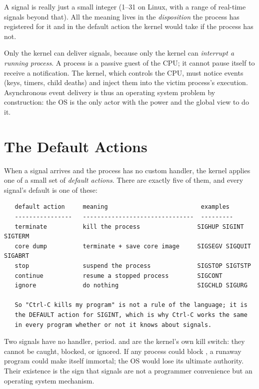 A signal is really just a small integer (1--31 on Linux, with a range
of real-time signals beyond that). All the meaning lives in the
\emph{disposition} the process has registered for it and in the default
action the kernel would take if the process has not.

\begin{osconcept}
Only the kernel can deliver signals, because only the kernel can
\emph{interrupt a running process}. A process is a passive guest of the
CPU; it cannot pause itself to receive a notification. The kernel, which
controls the CPU, must notice events (keys, timers, child deaths) and
inject them into the victim process's execution. Asynchronous event
delivery is thus an operating system problem by construction: the OS is
the only actor with the power and the global view to do it.
\end{osconcept}

\section{The Default Actions}

When a signal arrives and the process has no custom handler, the kernel
applies one of a small set of \emph{default actions}. There are exactly
five of them, and every signal's default is one of these:

\begin{verbatim}
   default action     meaning                          examples
   ----------------   -------------------------------  ---------
   terminate          kill the process                SIGHUP SIGINT SIGTERM
   core dump          terminate + save core image     SIGSEGV SIGQUIT SIGABRT
   stop               suspend the process             SIGSTOP SIGTSTP
   continue           resume a stopped process        SIGCONT
   ignore             do nothing                      SIGCHLD SIGURG

   So "Ctrl-C kills my program" is not a rule of the language; it is
   the DEFAULT action for SIGINT, which is why Ctrl-C works the same
   in every program whether or not it knows about signals.
\end{verbatim}

Two signals have no handler, period.  and
 are the kernel's own kill switch: they cannot be caught,
blocked, or ignored. If any process could block , a
runaway program could make itself immortal; the OS would lose its
ultimate authority. Their existence is the sign that signals are not a
programmer convenience but an operating system mechanism.

